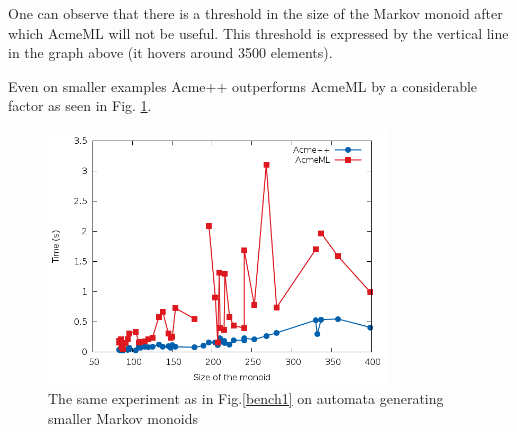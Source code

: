 One can observe that there is a threshold in the size of the Markov
monoid after which AcmeML will not be useful. This threshold is
expressed by the vertical line in the graph above (it hovers around
3500 elements).

Even on smaller examples Acme++ outperforms AcmeML by a considerable
factor as seen in Fig. \ref{bench1zoomed}.

\begin{figure}[h!]
  \label{bench1zoomed}
  \begin{center}
    \includegraphics[width=0.8\textwidth]{graph/zoomlines}
    \caption{The same experiment as in Fig.\ref{bench1} on automata
      generating smaller Markov monoids}
  \end{center}  
\end{figure}
